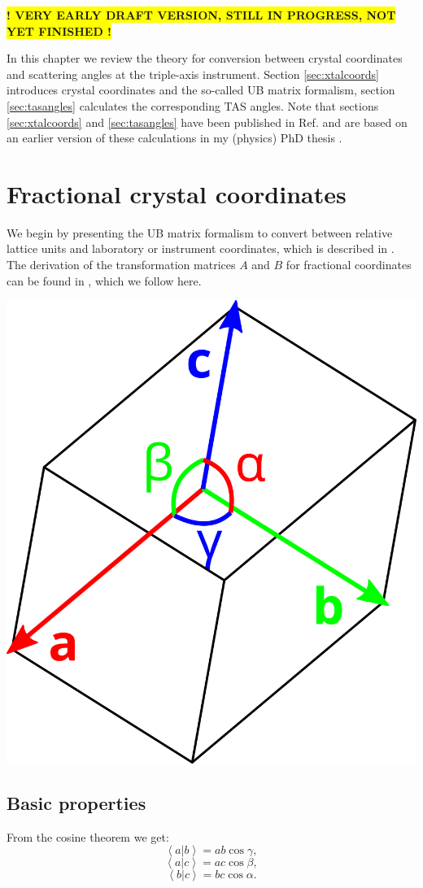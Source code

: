 %
%

{\bf \colorbox{yellow}{! VERY EARLY DRAFT VERSION, STILL IN PROGRESS, NOT YET FINISHED !}}
\vspace{1cm}

In this chapter we review the theory for conversion between crystal coordinates and scattering angles at the triple-axis instrument. Section \ref{sec:xtalcoords} introduces crystal coordinates and the so-called UB matrix formalism, section \ref{sec:tasangles} calculates the corresponding TAS angles. Note that sections \ref{sec:xtalcoords} and \ref{sec:tasangles} have been published in Ref. \cite{Takin2021} and are based on an earlier version of these calculations in my (physics) PhD thesis \cite{PhDWeber}.


\section{Fractional crystal coordinates \label{sec:xtalcoords}}

We begin by presenting the UB matrix formalism to convert between relative lattice units and laboratory or instrument coordinates, which is described in \cite{Lumsden2005}. The derivation of the transformation matrices $A$ and $B$ for fractional coordinates can be found in \cite{wiki_fractional}, which we follow here.

\begin{center}
	\includegraphics[width = 0.2 \textwidth]{figures/cell}
\end{center}

\subsection*{Basic properties}

From the cosine theorem we get:
\begin{equation} \left< a | b \right > = ab \cos \gamma, \label{ab} \end{equation}
\begin{equation} \left< a | c \right > = ac \cos \beta, \label{ac} \end{equation}
\begin{equation} \left< b | c \right > = bc \cos \alpha. \label{bc} \end{equation}



